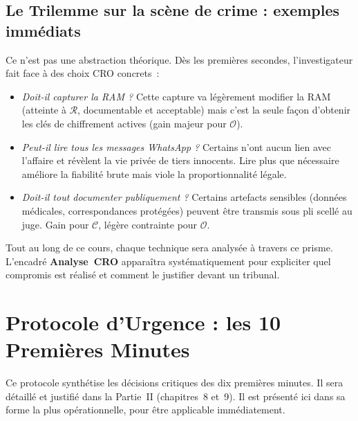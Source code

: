 \subsection{Le Trilemme sur la scène de crime : exemples immédiats}

Ce n'est pas une abstraction théorique. Dès les premières secondes,
l'investigateur fait face à des choix CRO concrets~:

\begin{itemize}
    \item \textit{Doit-il capturer la RAM ?} Cette capture va légèrement
          modifier la RAM (atteinte à $\mathcal{R}$, documentable et
          acceptable) mais c'est la seule façon d'obtenir les clés de
          chiffrement actives (gain majeur pour $\mathcal{O}$).
          \hfill{}

    \item \textit{Peut-il lire tous les messages WhatsApp ?} Certains n'ont
          aucun lien avec l'affaire et révèlent la vie privée de tiers
          innocents. Lire plus que nécessaire améliore la fiabilité brute
          mais viole la proportionnalité légale.
          \hfill\cro{$\downarrow$}{$\uparrow$}{$\sim$}

    \item \textit{Doit-il tout documenter publiquement ?} Certains artefacts
          sensibles (données médicales, correspondances protégées) peuvent
          être transmis sous pli scellé au juge. Gain pour $\mathcal{C}$,
          légère contrainte pour $\mathcal{O}$.
          \hfill{}
\end{itemize}

\medskip

Tout au long de ce cours, chaque technique sera analysée à travers ce prisme.
L'encadré \textbf{Analyse~CRO} apparaîtra systématiquement pour expliciter
quel compromis est réalisé et comment le justifier devant un tribunal.

\section{Protocole d'Urgence : les 10 Premières Minutes}
\label{sec:protocole-urgence}

Ce protocole synthétise les décisions critiques des dix premières minutes.
Il sera détaillé et justifié dans la Partie~II (chapitres~8 et~9). Il est
présenté ici dans sa forme la plus opérationnelle, pour être applicable
immédiatement.

